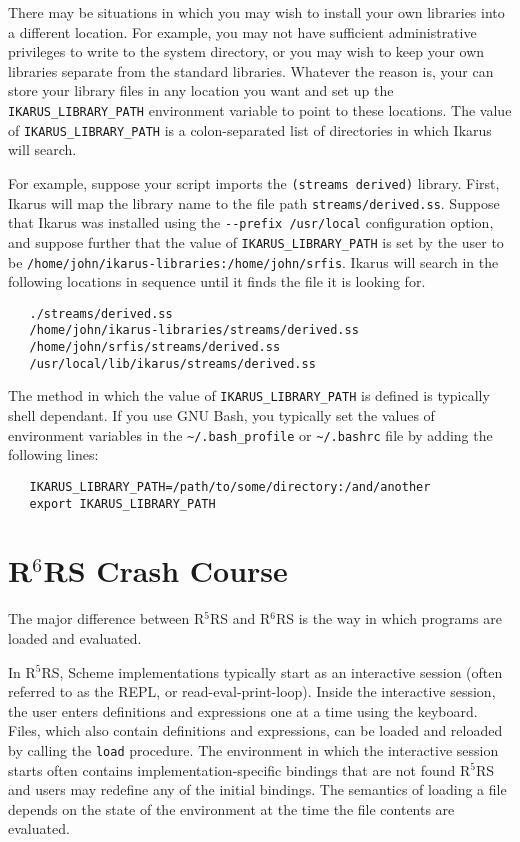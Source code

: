 \documentclass[onecolumn, 12pt, twoside, openright, dvipdfm]{book}
\newcommand{\rnrs}[1]{R$^{\mathrm{#1}}$RS}
\begin{document}
There may be situations in which you may wish to install your own
libraries into a different location.  For example, you may not have
sufficient administrative privileges to write to the system
directory, or you may wish to keep your own libraries separate from
the standard libraries.  Whatever the reason is, your can store your
library files in any location you want and set up the
\verb|IKARUS_LIBRARY_PATH| environment variable to point to these
locations.  The value of \verb|IKARUS_LIBRARY_PATH| is a
colon-separated list of directories in which Ikarus will search.

For example, suppose your script imports the
\texttt{(streams~derived)} library.  First, Ikarus will map the
library name to the file path \verb|streams/derived.ss|.  Suppose
that Ikarus was installed using the \verb|--prefix /usr/local|
configuration option, and suppose further that the value of
\verb|IKARUS_LIBRARY_PATH| is set by the user to be 
\verb|/home/john/ikarus-libraries:/home/john/srfis|.  Ikarus will
search in the following locations in sequence until it finds the
file it is looking for.

\begin{verbatim}
   ./streams/derived.ss
   /home/john/ikarus-libraries/streams/derived.ss
   /home/john/srfis/streams/derived.ss
   /usr/local/lib/ikarus/streams/derived.ss
\end{verbatim}


The method in which the value of \verb|IKARUS_LIBRARY_PATH| is
defined is typically shell dependant.  If you use GNU Bash, you
typically set the values of environment variables in the
\verb|~/.bash_profile| or \verb|~/.bashrc| file by adding the
following lines:

\begin{verbatim}
   IKARUS_LIBRARY_PATH=/path/to/some/directory:/and/another
   export IKARUS_LIBRARY_PATH
\end{verbatim}


\chapter{\rnrs{6} Crash Course}

The major difference between \rnrs{5} and \rnrs{6} is the way
in which programs are loaded and evaluated.  

In \rnrs{5}, Scheme implementations typically start as an
interactive session (often referred to as the REPL, or
read-eval-print-loop).  Inside the interactive session, the user
enters definitions and expressions one at a time using the keyboard.
Files, which also contain definitions and expressions, can be loaded
and reloaded by calling the \texttt{load} procedure.  The
environment in which the interactive session starts often contains
implementation-specific bindings that are not found \rnrs{5} and
users may redefine any of the initial bindings.  The semantics of 
loading a file depends on the state of the environment at the time
the file contents are evaluated.
\end{document}
